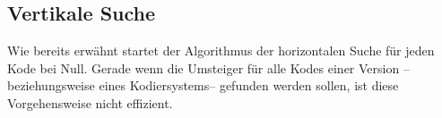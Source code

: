 \subsection{Vertikale Suche}
\label{vert-search}

Wie bereits erwähnt startet der Algorithmus der horizontalen Suche für jeden Kode bei Null. Gerade wenn die Umsteiger für alle Kodes einer Version -- beziehungsweise eines Kodiersystems-- gefunden werden sollen, ist diese Vorgehensweise nicht effizient. 

